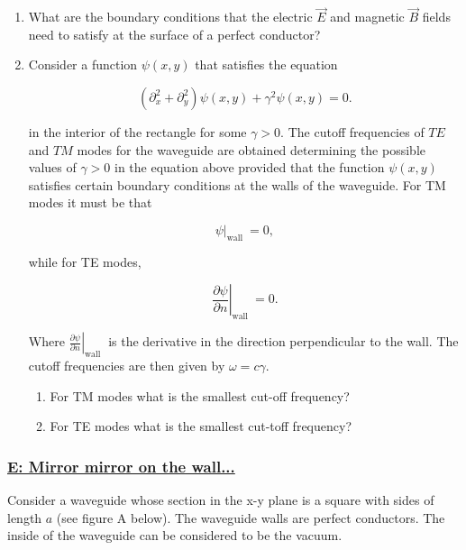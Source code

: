 \begin{enumerate}
	\item What are the boundary conditions that the electric $\vec{E}$ and magnetic $\vec{B}$ fields need to
	satisfy at the surface of a perfect conductor?
	\item Consider a function $\psi(x, y)$ that satisfies the equation
	
	\begin{equation}
		\left(\partial_{x}^{2}+\partial_{y}^{2}\right) \psi(x, y)+\gamma^{2} \psi(x, y)=0.
	\end{equation}

	in the interior of the rectangle for some $\gamma>0 .$ The cutoff frequencies of $T E$ and $T M$ modes for the waveguide are obtained determining the possible values of $\gamma>0$ in the equation above provided that the function $\psi(x, y)$ satisfies certain boundary conditions at the walls of the waveguide. For TM modes it must be that

	\begin{equation}
		\left.\psi\right|_{\text {wall }}=0,
	\end{equation}

	while for TE modes,

	\begin{equation}
		\left.\frac{\partial \psi}{\partial n}\right|_{\text {wall }}=0.
	\end{equation}

	Where $\left.\frac{\partial \psi}{\partial n}\right|_{\text {wall }}$ is the derivative in the direction perpendicular to the wall. The cutoff frequencies are then given by $\omega=c \gamma$.

	\begin{enumerate}
		\item For TM modes what is the smallest cut-off frequency?
		\item  For TE modes what is the smallest cut-toff frequency?
	\end{enumerate}

\end{enumerate}

\subsubsection{\hyperref[E: Mirror mirror on the wall...]{E: Mirror mirror on the wall...}}

Consider a waveguide whose section in the x-y plane is a square with sides of length $a$ (see figure A below). The waveguide walls are perfect conductors. The inside of the waveguide can be considered to be the vacuum.

